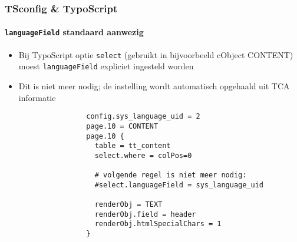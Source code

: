 \begin{frame}[fragile]
	\frametitle{TSconfig \& TypoScript}
	\framesubtitle{\texttt{languageField} standaard aanwezig}

	\lstset{basicstyle=\tiny\ttfamily}

	\begin{itemize}

		\item Bij TypoScript optie \texttt{select} (gebruikt in bijvoorbeeld cObject CONTENT) moest
			\texttt{languageField} expliciet ingesteld worden

		\item Dit is niet meer nodig; de instelling wordt automatisch opgehaald uit TCA informatie


			\begin{lstlisting}
				config.sys_language_uid = 2
				page.10 = CONTENT
				page.10 {
				  table = tt_content
				  select.where = colPos=0

				  # volgende regel is niet meer nodig:
				  #select.languageField = sys_language_uid

				  renderObj = TEXT
				  renderObj.field = header
				  renderObj.htmlSpecialChars = 1
				}
			\end{lstlisting}

	\end{itemize}

\end{frame}

